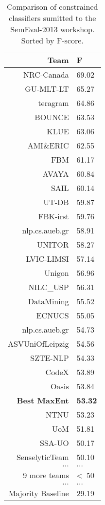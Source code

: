 \documentclass[12pt]{article}
\begin{document}
\begin{table}[H]
    \begin{center}
    \begin{tabular}{|r|l|}
        \hline
        Team       & F \\
        \hline
        NRC-Canada & 69.02 \\
        GU-MLT-LT  & 65.27 \\
        teragram   & 64.86 \\
        BOUNCE     & 63.53 \\
        KLUE       & 63.06 \\
        AMI\&ERIC  & 62.55 \\
        FBM        & 61.17 \\
        AVAYA      & 60.84 \\
        SAIL       & 60.14 \\
        UT-DB      & 59.87 \\
        FBK-irst   & 59.76 \\
        nlp.cs.aueb.gr & 58.91 \\
        UNITOR     & 58.27 \\
        LVIC-LIMSI & 57.14 \\
        Unigon     & 56.96 \\
        NILC\_USP  & 56.31 \\
        DataMining & 55.52 \\
        ECNUCS     & 55.05 \\
        nlp.cs.aueb.gr & 54.73 \\
        ASVUniOfLeipzig & 54.56 \\
        SZTE-NLP   & 54.33 \\
        CodeX      & 53.89 \\
        Oasis      & 53.84 \\
        \textbf{Best MaxEnt}& \textbf{53.32} \\
        NTNU       & 53.23 \\
        UoM        & 51.81 \\
        SSA-UO     & 50.17 \\
        SenselyticTeam & 50.10 \\
        $\ldots$   & $\ldots$ \\
        9 more teams &  \textless\ 50 \\
        $\ldots$   & $\ldots$ \\
        \hline
        Majority Baseline & 29.19 \\
        \hline
    \end{tabular}
    \end{center}
    \caption{Comparison of constrained classifiers sumitted to the SemEval-2013
        workshop. Sorted by F-score.}
    \label{table:comparison}
\end{table}
\end{document}
